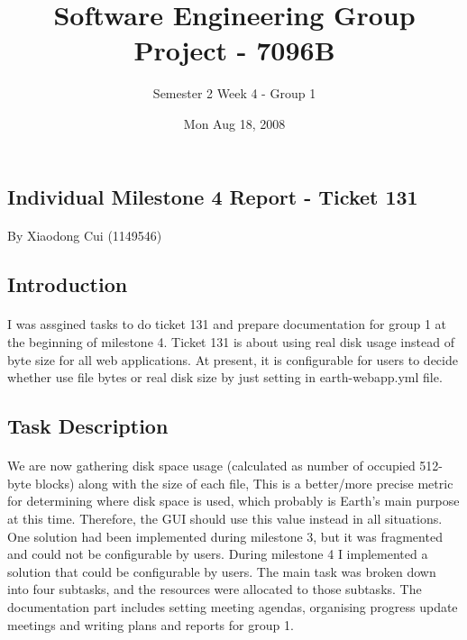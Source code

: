 \documentclass[oneside, 10pt, a4]{article}
\begin{document}
\title{Software Engineering Group Project - 7096B}
\author{Semester 2 Week 4 - Group 1}
\date{Mon Aug 18, 2008}

\maketitle

\begin{center}
\section{Individual Milestone 4 Report - Ticket 131}
\end{center}

\paragraph{} By Xiaodong Cui (1149546)


\subsection*{Introduction}

\paragraph{}
I was assgined tasks to do ticket 131 and prepare documentation for group 1 at the beginning of milestone 4. Ticket 131 is about using real disk usage instead of byte size for all web applications. At present, it is configurable for users to decide whether use file bytes or real disk size by just setting in earth-webapp.yml file.

\subsection*{Task Description}

\paragraph{}
We are now gathering disk space usage (calculated as number of occupied 512-byte blocks) along with the size of each file, This is a better/more precise metric for determining where disk space is used, which probably is Earth's main purpose at this time. Therefore, the GUI should use this value instead in all situations. One solution had been implemented during milestone 3, but it was fragmented and could not be configurable by users. During milestone 4 I implemented a solution that could be configurable by users. The main task was broken down into four subtasks, and the resources were allocated to those subtasks. The documentation part includes setting meeting agendas, organising progress update meetings and writing plans and reports for group 1.
\end{document}
